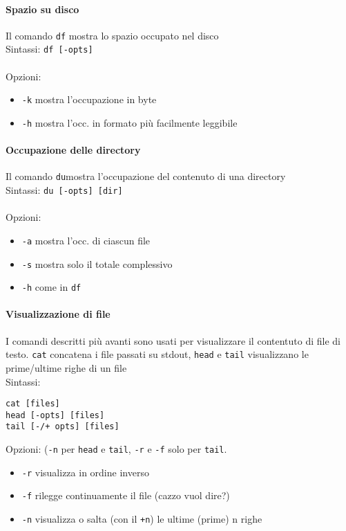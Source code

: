 \documentclass[a4paper, 10pt]{article}
\begin{document}
\paragraph{Spazio su disco} Il comando \verb|df| mostra lo spazio occupato nel disco \\
Sintassi: \verb|df [-opts]| \\ \\
Opzioni:
\begin{itemize}
\item \verb|-k| mostra l'occupazione in byte
\item \verb|-h| mostra l'occ. in formato più facilmente leggibile
\end{itemize}
\paragraph{Occupazione delle directory} Il comando \verb|du|mostra l'occupazione del contenuto di una directory \\
Sintassi: \verb|du [-opts] [dir]| \\ \\
Opzioni:
\begin{itemize}
\item \verb|-a| mostra l'occ. di ciascun file
\item \verb|-s| mostra solo il totale complessivo
\item \verb|-h| come in \verb|df|
\end{itemize}
\paragraph{Visualizzazione di file} I comandi descritti più avanti sono usati per visualizzare il contentuto di file di testo. \verb|cat| concatena i file passati su stdout, \verb|head| e \verb|tail| visualizzano le prime/ultime righe di un file \\
Sintassi:
\begin{verbatim}
cat [files]
head [-opts] [files]
tail [-/+ opts] [files]
\end{verbatim}

Opzioni: (\verb|-n| per \verb|head| e \verb|tail|, \verb|-r| e \verb|-f| solo per \verb|tail|.
\begin{itemize}
\item \verb|-r| visualizza in ordine inverso
\item \verb|-f| rilegge continuamente il file (cazzo vuol dire?)
\item \verb|-n| visualizza o salta (con il \verb|+n|) le ultime (prime) n righe
\end{itemize}
\end{document}

